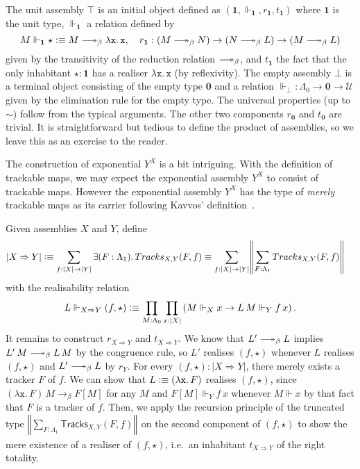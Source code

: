 \documentclass[a4paper,UKenglish,numberwithinsect,cleveref,thm-restate]{lipics-v2021}
\newcommand{\trunc}[2]{\mathopen{}\left\Vert #2\right\Vert_{#1}\mathclose{}}
\newcommand{\brck}[1]{\trunc{}{#1}}
\newcommand{\defeq}{\vcentcolon\equiv}
\newcommand{\Univ}{\mathcal{U}}
\newcommand{\Unit}{\mathbf{1}}
\newcommand{\Empty}{\mathbf{0}}
\DeclareRobustCommand\longtwoheadrightarrow{\relbar\joinrel\twoheadrightarrow}
\newcommand{\reduce}{\longtwoheadrightarrow_{\beta}}
\newcommand{\onereduce}{\longrightarrow_{\beta}}
\theoremstyle{plain}
\begin{document}
The unit assembly $\top$ is an initial object defined as $(\Unit, \Vdash_{\Unit}, r_{\Unit}, t_{\Unit})$ where $\Unit$ is the unit type,  
$\Vdash_{\Unit}$ a relation defined by
\[
  M \Vdash_{\Unit} \star \defeq M \reduce \mathtt{\lambda x.\, x}, 
  \quad r_{\Unit}: (M \reduce N) \to (N \reduce L) \to (M \reduce L)
\]
given by the transitivity of the reduction relation $\reduce$, and $t_{\Unit}$ the fact that the only inhabitant $\star : \Unit$ has a realiser $\mathtt{\lambda x.\, x}$ (by reflexivity).
The empty assembly $\bot$ is a terminal object consisting of the empty type $\Empty$ and a relation $\Vdash_\bot : \Lambda_0 \to \Empty \to \Univ$ given by the elimination rule for the empty type.
The universal properties (up to $\sim$) follow from the typical arguments. 
The other two components $r_\Empty$ and $t_\Empty$ are trivial.
It is straightforward but tedious to define the product of assemblies, so we leave this as an exercise to the reader. 

The construction of exponential $Y^X$ is a bit intriguing.
With the definition of trackable maps, we may expect the exponential assembly $Y^X$ to consist of trackable maps.
However the exponential assembly $Y^X$ has the type of \emph{merely} trackable maps as its carrier following Kavvos' definition~\cite{Kavvos2017c}.  
\begin{example}
  Given assemblies $X$ and $Y$, define
  \begin{align*}
    |X \Rightarrow Y| & \defeq \sum_{f : |X| \to |Y|} \exists (F : \Lambda_1).\, \mathsf{Tracks}_{X, Y}(F, f) \equiv \sum_{f : |X| \to |Y|} \brck{\sum_{F : \Lambda_1} \mathsf{Tracks}_{X, Y}(F, f) }
  \end{align*}
  with the realisability relation 
  \[
    L \Vdash_{X \Rightarrow Y} (f, \star) \defeq \prod_{M : \Lambda_0} \prod_{x : |X|}\left( M \Vdash_X x \to L\,M \Vdash_Y f\,x\right).
  \]
  It remains to construct $r_{X\Rightarrow Y}$ and $t_{X \Rightarrow Y}$. 
  We know that $L' \reduce L$ implies $L'\,M \reduce L\,M$ by the congruence rule, so $L'$ realises $(f, \star)$ whenever $L$ realises $(f, \star)$ and $L' \reduce L$ by $r_Y$.
  For every $(f, \star) : |X \Rightarrow Y|$, there merely exists a tracker $F$ of $f$.
  We can show that $L \defeq \left(\mathtt{\lambda x}.\,F\right)$ realises $(f, \star)$, since
  $\left(\mathtt{\lambda x}.\,F\right)\,M \onereduce F[M]$ for any $M$ and $F[M] \Vdash_Y f\,x$ whenever $M \Vdash x$
  by that fact that $F$ is a tracker of $f$.
  Then, we apply the recursion principle of the truncated type $\brck{\sum_{F : \Lambda_1} \mathsf{Tracks}_{X, Y}(F, f) }$ on the second component of $(f, \star)$ to show the mere existence of a realiser of $(f, \star)$, i.e.\ an inhabitant $t_{X \Rightarrow Y}$ of the right totality.

\end{example}
\end{document}
